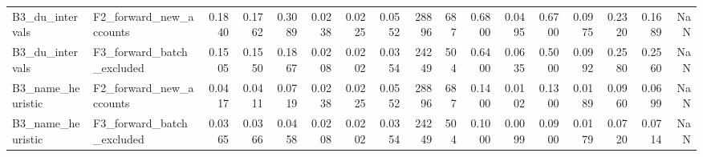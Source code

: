 \begin{table}
\begin{tabular}{llrrrrrrrrrrrrrrr}
B3\_du\_intervals & F2\_forward\_new\_accounts & 0.1840 & 0.1762 & 0.3089 & 0.0238 & 0.0225 & 0.0552 & 28896 & 687 & 0.6800 & 0.0495 & 0.6700 & 0.0975 & 0.2320 & 0.1689 & NaN \\
B3\_du\_intervals & F3\_forward\_batch\_excluded & 0.1505 & 0.1550 & 0.1867 & 0.0208 & 0.0202 & 0.0354 & 24249 & 504 & 0.6400 & 0.0635 & 0.5000 & 0.0992 & 0.2580 & 0.2560 & NaN \\
B3\_name\_heuristic & F2\_forward\_new\_accounts & 0.0417 & 0.0411 & 0.0719 & 0.0238 & 0.0225 & 0.0552 & 28896 & 687 & 0.1400 & 0.0102 & 0.1300 & 0.0189 & 0.0960 & 0.0699 & NaN \\
B3\_name\_heuristic & F3\_forward\_batch\_excluded & 0.0365 & 0.0366 & 0.0458 & 0.0208 & 0.0202 & 0.0354 & 24249 & 504 & 0.1000 & 0.0099 & 0.0900 & 0.0179 & 0.0720 & 0.0714 & NaN \\
\bottomrule
\end{tabular}
\end{table}
